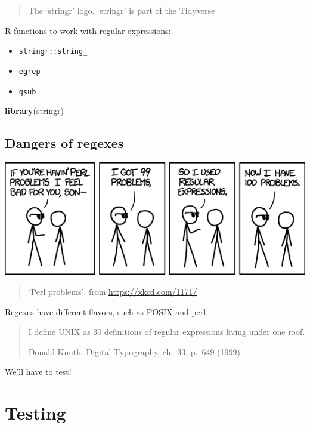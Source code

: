 \documentclass[]{book}
\newenvironment{Shaded}{}{}
\newcommand{\KeywordTok}[1]{\textcolor[rgb]{0.00,0.44,0.13}{\textbf{#1}}}
\newcommand{\NormalTok}[1]{#1}
\providecommand{\tightlist}{%
  \setlength{\itemsep}{0pt}\setlength{\parskip}{0pt}}
\begin{document}
\begin{quote}
The `stringr' logo. `stringr' is part of the Tidyverse
\end{quote}

R functions to work with regular expressions:

\begin{itemize}
\tightlist
\item
  \texttt{stringr::string\_}
\item
  \texttt{egrep}
\item
  \texttt{gsub}
\end{itemize}

\begin{Shaded}
\begin{Highlighting}[]
\KeywordTok{library}\NormalTok{(stringr)}
\end{Highlighting}
\end{Shaded}

\hypertarget{dangers-of-regexes}{%
\section{Dangers of regexes}\label{dangers-of-regexes}}

\includegraphics{06_perl_problems.png}

\begin{quote}
`Perl problems', from \url{https://xkcd.com/1171/}
\end{quote}

Regexes have different flavors, such as POSIX and perl.

\begin{quote}
I define UNIX as 30 definitions of regular expressions living under one roof.

Donald Knuth. Digital Typography, ch.~33, p.~649 (1999)
\end{quote}

We'll have to test!

\hypertarget{testing}{%
\chapter{Testing}\label{testing}}
\end{document}
